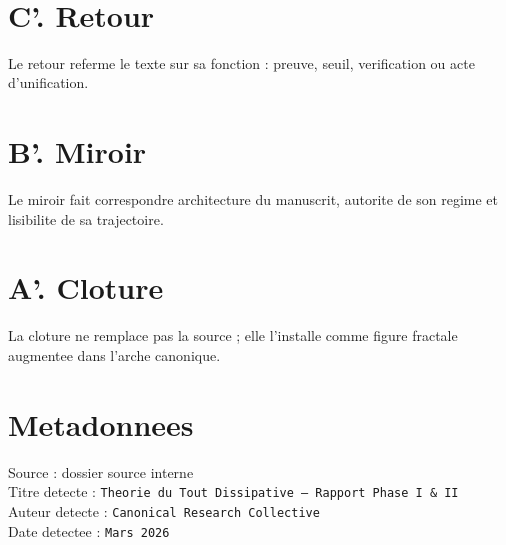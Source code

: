 ﻿﻿\documentclass[11pt,a4paper]{article}
\begin{document}
\section*{C'. Retour}

Le retour referme le texte sur sa fonction : preuve, seuil, verification ou acte d'unification.



\section*{B'. Miroir}

Le miroir fait correspondre architecture du manuscrit, autorite de son regime et lisibilite de sa trajectoire.



\section*{A'. Cloture}

La cloture ne remplace pas la source ; elle l'installe comme figure fractale augmentee dans l'arche canonique.



\section*{Metadonnees}

Source : dossier source interne\\

Titre detecte : \texttt{Theorie du Tout Dissipative -- Rapport Phase I \& II}\\

Auteur detecte : \texttt{Canonical Research Collective}\\

Date detectee : \texttt{Mars 2026}
\end{document}
